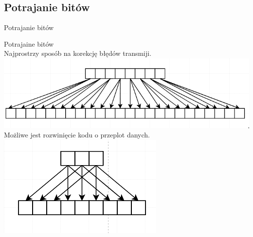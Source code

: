 \documentclass[12pt]{beamer}
\begin{document}
\subsection{Potrajanie bitów}
\begin{frame}{Potrajanie bitów}
\begin{center}
Potrajaine bitów\\
Najprostrzy sposób na korekcję błędów transmiji.
\includegraphics[scale= 0.25]{Potrajanie/potrajanie_proste.png}\\
Możliwe jest rozwinięcie kodu o przeplot danych.
\includegraphics[scale=0.25]{Potrajanie/potrajanie_przeplot.png}

\end{center}

\end{frame}
\end{document}
